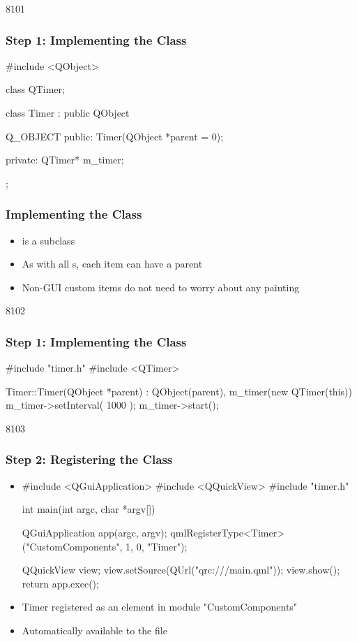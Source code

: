 
\begin{slide}[fragile]{8101}\frametitle{Step 1: Implementing the Class}

\begin{cpp}
#include <QObject>

class QTimer;

class Timer : public QObject
{
    Q_OBJECT
public:
    Timer(QObject *parent = 0);

private:
    QTimer* m_timer;
};
\end{cpp}
\end{slide}


\begin{slide}[fragile]\frametitle{Implementing the Class}
\begin{itemize}
\item {} is a  subclass
\item As with all s, each item can have a parent
\item Non-GUI custom items do not need to worry about any painting
\end{itemize}
\end{slide}


\begin{slide}[fragile]{8102}\frametitle{Step 1: Implementing the Class}
\begin{cpp}
#include "timer.h"
#include <QTimer>

Timer::Timer(QObject *parent)
    : QObject(parent),
      m_timer(new QTimer(this))
{
    m_timer->setInterval( 1000 );
    m_timer->start();
}
\end{cpp}
\end{slide}


\begin{slide}[fragile]{8103}\frametitle{Step 2: Registering the Class}

\begin{itemize}
\item[]
\begin{cpp}
#include <QGuiApplication>
#include <QQuickView>
#include "timer.h"

int main(int argc, char *argv[])
{
    QGuiApplication app(argc, argv);
    qmlRegisterType<Timer>("CustomComponents", 1, 0, "Timer");

    QQuickView view;
    view.setSource(QUrl("qrc:///main.qml"));
    view.show();
    return app.exec();
}
\end{cpp}

\item Timer registered as an element in module "CustomComponents"
\item Automatically available to the  file
\end{itemize}

\end{slide}

